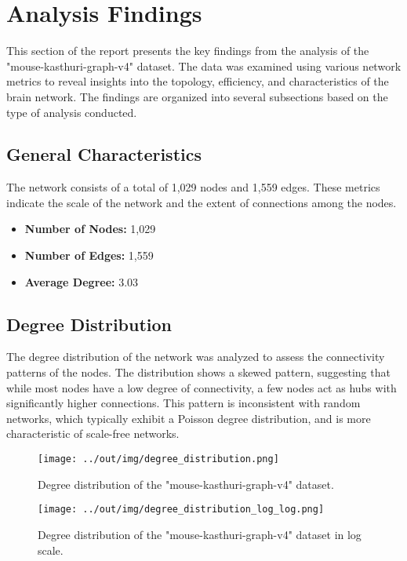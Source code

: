 \documentclass[
	report, %
	11pt, %
]{CSUniSchoolLabReport}
\begin{document}
\section{Analysis Findings}

This section of the report presents the key findings from the analysis of the "mouse-kasthuri-graph-v4" dataset. The data was examined using various network metrics to reveal insights into the topology, efficiency, and characteristics of the brain network. The findings are organized into several subsections based on the type of analysis conducted.

	\subsection{General Characteristics}

	The network consists of a total of 1,029 nodes and 1,559 edges. These metrics indicate the scale of the network and the extent of connections among the nodes.

	\begin{itemize}
		\item \textbf{Number of Nodes:} 1,029
		\item \textbf{Number of Edges:} 1,559
		\item \textbf{Average Degree:} 3.03
	\end{itemize}

	\subsection{Degree Distribution}

	The degree distribution of the network was analyzed to assess the connectivity patterns of the nodes. The distribution shows a skewed pattern, suggesting that while most nodes have a low degree of connectivity, a few nodes act as hubs with significantly higher connections. This pattern is inconsistent with random networks, which typically exhibit a Poisson degree distribution, and is more characteristic of scale-free networks.

	\begin{figure}[H]
		\centering
		\captionsetup{justification=centering}
		\texttt{[image: ../out/img/degree\_distribution.png]}
		\caption{Degree distribution of the "mouse-kasthuri-graph-v4" dataset.}
		\label{fig:deg_dist}
	\end{figure}

	\begin{figure}[H]
		\centering
		\captionsetup{justification=centering}
		\texttt{[image: ../out/img/degree\_distribution\_log\_log.png]}
		\caption{Degree distribution of the "mouse-kasthuri-graph-v4" dataset in log scale.}
		\label{fig:log_deg_dist}
	\end{figure}
\end{document}
